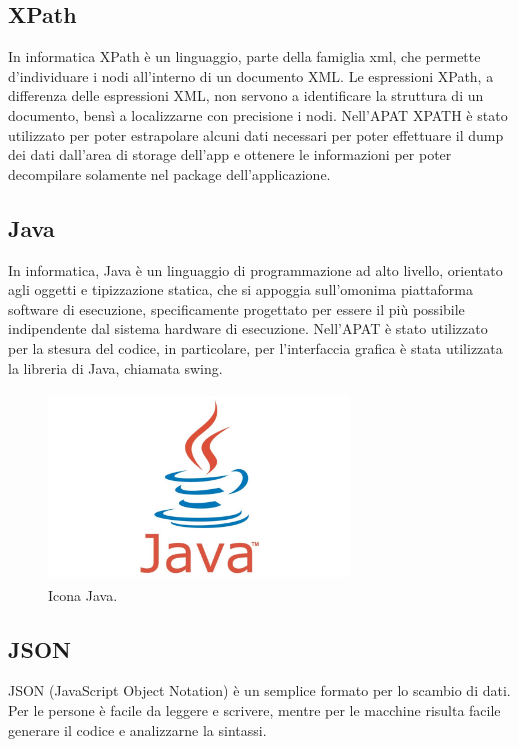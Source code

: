 \subsection*{XPath}\label{subsec:xpath}
In informatica XPath è un linguaggio, parte della famiglia \gls{xml}, che permette d'individuare i nodi all'interno di un documento XML. Le espressioni XPath, a differenza delle espressioni XML, non servono a identificare la struttura di un documento, bensì a localizzarne con precisione i nodi.
Nell'APAT XPATH è stato utilizzato per poter estrapolare alcuni dati necessari per poter effettuare il dump dei dati dall'area di storage dell'app e ottenere le informazioni per poter decompilare solamente nel package dell'applicazione.

\subsection*{Java}
In informatica, Java\cite{womak:effective-java} è un linguaggio di programmazione ad alto livello, orientato agli oggetti e tipizzazione statica, che si appoggia sull'omonima piattaforma software di esecuzione, specificamente progettato per essere il più possibile indipendente dal sistema hardware di esecuzione.
Nell'APAT è stato utilizzato per la stesura del codice, in particolare, per l'interfaccia grafica è stata utilizzata la libreria di Java, chiamata \gls{swing}.
\begin{figure}[H]
    \centering
    \includegraphics[width=8cm, height=5cm]{./immagini/java.jpg}
    \caption{Icona Java.}\label{fig:java}
\end{figure}

\subsection*{JSON}
JSON (JavaScript Object Notation) è un semplice formato per lo scambio di dati.
Per le persone è facile da leggere e scrivere, mentre per le macchine risulta facile generare il codice e analizzarne la sintassi.

